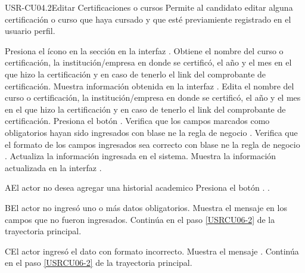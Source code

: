 \begin{UseCase}[]{USR-CU04.2}{Editar Certificaciones o cursos}{
	Permite al candidato editar alguna certificación o curso  que haya cursado y que esté previamiente registrado en el usuario perfil.
}
\end{UseCase}

\begin{UCtrayectoria}
	\UCpaso [\UCactor] Presiona el ícono \IUEditar{} en la sección en la interfaz .
	\UCpaso Obtiene  el nombre del curso o certificación, la institución/empresa en donde se certificó, el año y el mes en el que hizo la certificación y en caso de tenerlo el link del comprobante de certificación.
	\UCpaso Muestra información obtenida en la interfaz .
	\UCpaso [\UCsist] \label{USRCU06-2} Edita  el nombre del curso o certificación, la institución/empresa en donde se certificó, el año y el mes en el que hizo la certificación y en caso de tenerlo el link del comprobante de certificación.
	\UCpaso [\UCsist] Presiona el botón .
	\UCpaso Verifica que los campos marcados como obligatorios hayan sido ingresados con blase ne la regla de negocio .
	\UCpaso Verifica que el formato de los campos ingresados sea correcto con blase ne la regla de negocio .
	\UCpaso Actualiza la información ingresada en el sistema.
	\UCpaso Muestra la información actualizada en la interfaz . 
\end{UCtrayectoria}

\begin{UCtrayectoriaA}{A}{El actor no desea agregar una historial academico}
	\UCpaso [\UCsist] Presiona el botón .
	.
\end{UCtrayectoriaA} 

\begin{UCtrayectoriaA}{B}{El actor no ingresó uno o más datos obligatorios.}
	\UCpaso [\UCsist] Muestra el mensaje  en los campos que no fueron ingresados.
	\UCpaso [\UCsist] Continúa en el paso \ref{USRCU06-2} de la trayectoria principal.
\end{UCtrayectoriaA} 

\begin{UCtrayectoriaA}{C}{El actor ingresó el dato con formato incorrecto.}
	\UCpaso [\UCsist] Muestra el mensaje .
	\UCpaso [\UCsist] Continúa en el paso \ref{USRCU06-2} de la trayectoria principal.
\end{UCtrayectoriaA}



